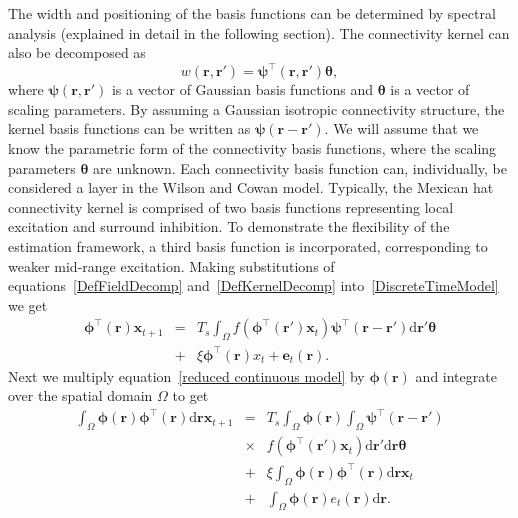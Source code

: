 \documentclass[12pt]{iopart}
\begin{document}
The width and positioning of the basis functions can be determined by spectral analysis (explained in detail in the following section). The connectivity kernel can also be decomposed as 
\begin{equation}\label{DefKernelDecomp}
	 w\left(\mathbf{r},\mathbf{r}'\right) =\boldsymbol{\psi}^\top\left(\mathbf{r},\mathbf{r}'\right) \boldsymbol{\theta},
\end{equation}
where $\boldsymbol{\psi}(\mathbf{r},\mathbf{r}')$ is a vector of Gaussian basis functions and $\boldsymbol{\theta}$ is a vector of scaling parameters. By assuming a Gaussian isotropic connectivity structure, the kernel basis functions can be written as $\boldsymbol{\psi}(\mathbf{r}-\mathbf{r}')$. We will assume that we know the parametric form of the connectivity basis functions, where the scaling parameters $\boldsymbol{\theta}$ are unknown. Each connectivity basis function can, individually, be considered a layer in the Wilson and Cowan model. Typically, the Mexican hat connectivity kernel is comprised of two basis functions representing local excitation and surround inhibition. To demonstrate the flexibility of the estimation framework, a third basis function is incorporated, corresponding to weaker mid-range excitation. Making substitutions of equations~\ref{DefFieldDecomp} and~\ref{DefKernelDecomp} into~\ref{DiscreteTimeModel} we get 
\begin{eqnarray}
	\label{reduced continuous model}
	\boldsymbol{\phi}^{\top}(\mathbf{r})\mathbf{x}_{t+1} &=& T_s\int_\Omega{f(\boldsymbol{\phi}^{\top}(\mathbf{r}')\mathbf{x}_t )\boldsymbol{\psi}^{\top}(\mathbf{r}-\mathbf{r}')\textrm{d}\mathbf{r}'}\boldsymbol{\theta} \nonumber \\
	&+& \xi\boldsymbol{\phi}^{\top}(\mathbf{r})x_t + \mathbf{e}_t(\mathbf{r}). 
\end{eqnarray}
Next we multiply equation~\ref{reduced continuous model} by $\boldsymbol{\phi}(\mathbf{r})$ and integrate over the spatial domain $\Omega$ to get 
\begin{eqnarray}
	\label{StartofReduction}
 	\int_\Omega {\boldsymbol{\phi} \left(\mathbf{r}\right)\boldsymbol{\phi}^{\top}\left(\mathbf{r}\right) \textrm{d}\mathbf{r}} \mathbf{x}_{t+1} &=&
 T_s \int_\Omega \boldsymbol{\phi} (\mathbf{r}) \int_\Omega \boldsymbol{\psi}^{\top} (\mathbf{r}-\mathbf{r}') \nonumber \\
&\times& { f(\boldsymbol{\phi}^{\top}(\mathbf{r}') \mathbf{x}_t ) \textrm{d}\mathbf{r}'\textrm{d}\mathbf{r}}\boldsymbol{\theta} \nonumber \\ 
&+& \xi\int_\Omega {\boldsymbol{\phi}(\mathbf{r})\boldsymbol{\phi}^{\top}(\mathbf{r})\textrm{d}\mathbf{r}} \mathbf{x}_t \nonumber \\ &+& 
\int_\Omega{\boldsymbol{\phi} (\mathbf{r}) e_t(\mathbf{r})\textrm{d}\mathbf{r}}. 
\end{eqnarray}
\end{document}
